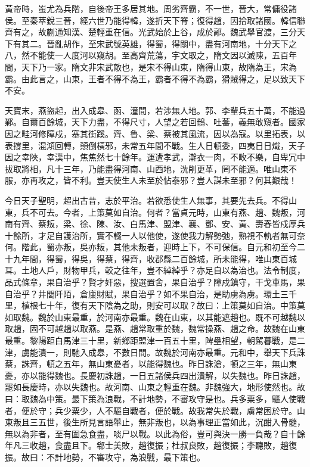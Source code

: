 \begin{pinyinscope}
 黃帝時，蚩尤為兵階，自後帝王多居其地。周劣齊霸，不一世，晉大，常傭役諸侯。至秦萃銳三晉，經六世乃能得韓，遂折天下脊；復得趙，因拾取諸國。韓信聯齊有之，故蒯通知漢、楚輕重在信。光武始於上谷，成於鄗。魏武舉官渡，三分天下有其二。晉亂胡作，至宋武號英雄，得蜀，得關中，盡有河南地，十分天下之八，然不能使一人度河以窺胡。至高齊荒蕩，宇文取之，隋文因以滅陳，五百年間，天下乃一家。隋文非宋武敵也，是宋不得山東，隋得山東，故隋為王，宋為霸。由此言之，山東，王者不得不為王，霸者不得不為霸，猾賊得之，足以致天下不安。



 天寶末，燕盜起，出入成皋、函、潼間，若涉無人地。郭、李輩兵五十萬，不能過鄴。自爾百餘城，天下力盡，不得尺寸，人望之若回鶻、吐蕃，義無敢窺者。國家因之畦河修障戍，塞其街蹊。齊、魯、梁、蔡被其風流，因以為寇。以里拓表，以表撐里，混澒回轉，顛倒橫邪，未常五年間不戰。生人日頓委，四夷日日熾，天子因之幸陜，幸漢中，焦焦然七十餘年。運遭孝武，澣衣一肉，不畋不樂，自卑冗中拔取將相，凡十三年，乃能盡得河南、山西地，洗削更革，罔不能適。唯山東不服，亦再攻之，皆不利。豈天使生人未至於怗泰邪？豈人謀未至邪？何其艱哉！



 今日天子聖明，超出古昔，志於平治。若欲悉使生人無事，其要先去兵。不得山東，兵不可去。今者，上策莫如自治。何者？當貞元時，山東有燕、趙、魏叛，河南有齊、蔡叛，梁、徐、陳、汝、白馬津、盟津、襄、鄧、安、黃、壽春皆戍厚兵十餘所，才足自護治所，實不輟一人以他使，遂使我力解勢弛，熟視不軌者無可奈何。階此，蜀亦叛，吳亦叛，其他未叛者，迎時上下，不可保信。自元和初至今二十九年間，得蜀，得吳，得蔡，得齊，收郡縣二百餘城，所未能得，唯山東百城耳。土地人戶，財物甲兵，較之往年，豈不綽綽乎？亦足自以為治也。法令制度，品式條章，果自治乎？賢才奸惡，搜選置舍，果自治乎？障戍鎮守，干戈車馬，果自治乎？井閭阡陌，倉廩財賦，果自治乎？如不果自治，是助虜為虜。環土三千里，植根七十年，復有天下陰為之助，則安可以取？故曰：上策莫如自治。中策莫如取魏。魏於山東最重，於河南亦最重。魏在山東，以其能遮趙也。既不可越魏以取趙，固不可越趙以取燕。是燕、趙常取重於魏，魏常操燕、趙之命。故魏在山東最重。黎陽距白馬津三十里，新鄉距盟津一百五十里，陴壘相望，朝駕暮戰，是二津，虜能潰一，則馳入成皋，不數日間。故魏於河南亦最重。元和中，舉天下兵誅蔡，誅齊，頓之五年，無山東憂者，以能得魏也。昨日誅滄，頓之三年，無山東憂，亦以能得魏也。長慶初誅趙，一日五諸侯兵四出潰解，以失魏也。昨日誅趙，罷如長慶時，亦以失魏也。故河南、山東之輕重在魏。非魏強大，地形使然也。故曰：取魏為中策。最下策為浪戰，不計地勢，不審攻守是也。兵多粟多，驅人使戰者，便於守；兵少粟少，人不驅自戰者，便於戰。故我常失於戰，虜常困於守。山東叛且三五世，後生所見言語舉止，無非叛也，以為事理正當如此，沉酣入骨髓，無以為非者，至有圍急食盡，啖尸以戰。以此為俗，豈可與決一勝一負哉？自十餘年凡三收趙，食盡且下。郗士美敗，趙復振；杜叔良敗，趙復振；李聽敗，趙復振。故曰：不計地勢，不審攻守，為浪戰，最下策也。




\end{pinyinscope}
